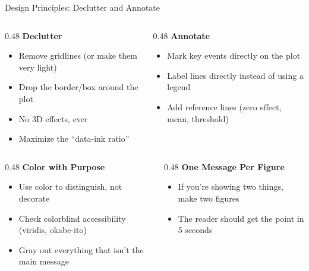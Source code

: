 \begin{frame}{Design Principles: Declutter and Annotate}
  \footnotesize
  \begin{columns}[T]
    \begin{column}{0.48\textwidth}
      \textbf{\textcolor{usfgreen}{Declutter}}
      \begin{itemize}\setlength\itemsep{0pt}
        \item Remove gridlines (or make them very light)
        \item Drop the border/box around the plot
        \item No 3D effects, ever
        \item Maximize the ``data-ink ratio''
      \end{itemize}
    \end{column}
    \begin{column}{0.48\textwidth}
      \textbf{\textcolor{usfgreen}{Annotate}}
      \begin{itemize}\setlength\itemsep{0pt}
        \item Mark key events directly on the plot
        \item Label lines directly instead of using a legend
        \item Add reference lines (zero effect, mean, threshold)
      \end{itemize}
    \end{column}
  \end{columns}

  \vspace{8pt}

  \begin{columns}[T]
    \begin{column}{0.48\textwidth}
      \textbf{\textcolor{usfgreen}{Color with Purpose}}
      \begin{itemize}\setlength\itemsep{0pt}
        \item Use color to distinguish, not decorate
        \item Check colorblind accessibility (viridis, okabe-ito)
        \item Gray out everything that isn't the main message
      \end{itemize}
    \end{column}
    \begin{column}{0.48\textwidth}
      \textbf{\textcolor{usfgreen}{One Message Per Figure}}
      \begin{itemize}\setlength\itemsep{0pt}
        \item If you're showing two things, make two figures
        \item The reader should get the point in 5 seconds
      \end{itemize}
    \end{column}
  \end{columns}
\end{frame}

